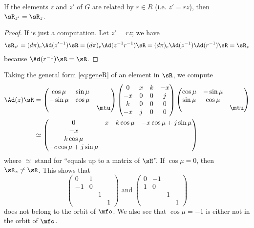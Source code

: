 \begin{proposition}
If the elements $z$ and $z'$ of $G$ are related by $r\in R$ (i.e. $z'=rz$), then $\sR_{z'}=\sR_z$.
\end{proposition}

\begin{proof}
If is just a computation. Let $z'=rz$; we have
\begin{equation}
\begin{split}
\sR_{z'}=(d\pi)_e\Ad(z'\,\!^{-1})\sR
        =(d\pi)_e\Ad(z^{-1} r^{-1})\sR
	=(d\pi)_e\Ad(z^{-1})\Ad(r^{-1})\sR
	=\sR_z
\end{split}
\end{equation}
because $\Ad(r^{-1})\sR=\sR$.
\end{proof}

Taking the general form \eqref{eq:geneR} of an element in $\sR$, we compute
\begin{equation}
\begin{split}
\Ad(z)\sR&=
\begin{pmatrix}
\cos\mu & \sin\mu\\
-\sin\mu & \cos\mu\\
&&\mtu
\end{pmatrix}
\begin{pmatrix}
0&x&k&-x\\
-x&0&0&j\\
k&0&0&0\\
-x&j&0&0
\end{pmatrix}
\begin{pmatrix}
\cos\mu & -\sin\mu\\
\sin\mu & \cos\mu\\
&&\mtu
\end{pmatrix}
\\
&\simeq
\begin{pmatrix}
0& x&k\cos\mu &-x\cos\mu+j\sin\mu\\
-x\\
k\cos\mu\\
-c\cos\mu+j\sin\mu
\end{pmatrix}
\end{split}
\end{equation}
where $\simeq$ stand for ``equals up to a matrix of $\sH$''. If $\cos\mu=0$, then $\sR_z\neq\sR$. This shows that
\begin{equation}
\begin{pmatrix}
0&1\\
-1&0\\
&&1\\
&&&1
\end{pmatrix}
\text{ and }
\begin{pmatrix}
0&-1\\
1&0\\
&&1\\
&&&1
\end{pmatrix}
\end{equation}
does not belong to the orbit of $\mfo$. We also see that $\cos \mu=-1$ is either not in the orbit of $\mfo$.

